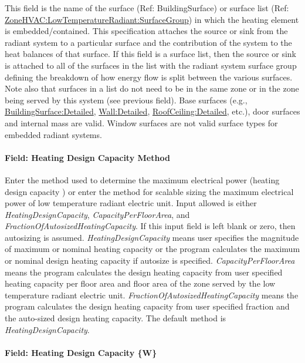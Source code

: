This field is the name of the surface (Ref: BuildingSurface) or surface list (Ref: \hyperref[zonehvaclowtemperatureradiantsurfacegroup]{ZoneHVAC:LowTemperatureRadiant:SurfaceGroup}) in which the heating element is embedded/contained. This specification attaches the source or sink from the radiant system to a particular surface and the contribution of the system to the heat balances of that surface. If this field is a surface list, then the source or sink is attached to all of the surfaces in the list with the radiant system surface group defining the breakdown of how energy flow is split between the various surfaces. Note also that surfaces in a list do not need to be in the same zone or in the zone being served by this system (see previous field). Base surfaces (e.g., \hyperref[buildingsurfacedetailed]{BuildingSurface:Detailed}, \hyperref[walldetailed]{Wall:Detailed}, \hyperref[roofceilingdetailed]{RoofCeiling:Detailed}, etc.), door surfaces and internal mass are valid. Window surfaces are not valid surface types for embedded radiant systems.

\paragraph{Field: Heating Design Capacity Method}\label{field-heating-design-capacity-method-6}

Enter the method used to determine the maximum electrical power (heating design capacity ) or enter the method for scalable sizing the maximum electrical power of low temperature radiant electric unit. Input allowed is either \emph{HeatingDesignCapacity}, \emph{CapacityPerFloorArea}, and \emph{FractionOfAutosizedHeatingCapacity}. If this input field is left blank or zero, then autosizing is assumed. \emph{HeatingDesignCapacity} means user specifies the magnitude of maximum or nominal heating capacity or the program calculates the maximum or nominal design heating capacity if autosize is specified. \emph{CapacityPerFloorArea} means the program calculates the design heating capacity from user specified heating capacity per floor area and floor area of the zone served by the low temperature radiant electric unit. \emph{FractionOfAutosizedHeatingCapacity} means the program calculates the design heating capacity from user specified fraction and the auto-sized design heating capacity. The default method is \emph{HeatingDesignCapacity}.

\paragraph{Field: Heating Design Capacity \{W\}}\label{field-heating-design-capacity-w-6}

